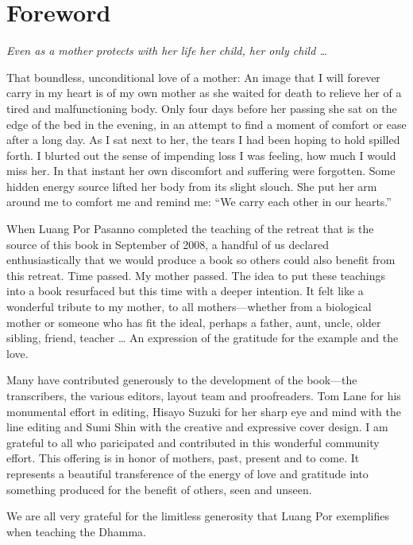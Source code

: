 \chapter{Foreword}

{\center
\emph{Even as a mother protects with her life her child, her only
child \ldots{}}

}

\vspace{1em}\noindent
That boundless, unconditional love of a mother: An image that I will
forever carry in my heart is of my own mother as she waited for death to
relieve her of a tired and malfunctioning body. Only four days before
her passing she sat on the edge of the bed in the evening, in an attempt
to find a moment of comfort or ease after a long day. As I sat next to
her, the tears I had been hoping to hold spilled forth. I blurted out
the sense of impending loss I was feeling, how much I would miss her. In
that instant her own discomfort and suffering were forgotten. Some
hidden energy source lifted her body from its slight slouch. She put her
arm around me to comfort me and remind me: “We carry each other in our
hearts.”

When Luang Por Pasanno completed the teaching of the retreat that is the
source of this book in September of 2008, a handful of us declared
enthusiastically that we would produce a book so others could also
benefit from this retreat. Time passed. My mother passed. The idea to
put these teachings into a book resurfaced but this time with a deeper
intention. It felt like a wonderful tribute to my mother, to all
mothers—whether from a biological mother or someone who has fit the
ideal, perhaps a father, aunt, uncle, older sibling, friend, teacher \ldots{}
An expression of the gratitude for the example and the love.

Many have contributed generously to the development of the book—the
transcribers, the various editors, layout team and proofreaders. Tom
Lane for his monumental effort in editing, Hisayo Suzuki for her sharp
eye and mind with the line editing and Sumi Shin with the creative and
expressive cover design. I am grateful to all who paricipated and
contributed in this wonderful community effort. This offering is in
honor of mothers, past, present and to come. It represents a beautiful
transference of the energy of love and gratitude into something produced
for the benefit of others, seen and unseen.

We are all very grateful for the limitless generosity that Luang Por
exemplifies when teaching the Dhamma.
